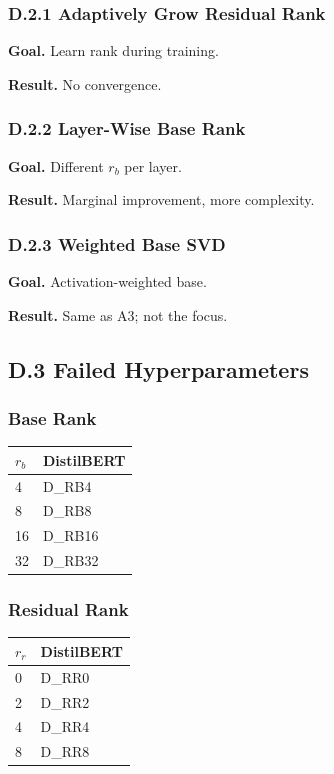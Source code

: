 \subsubsection{D.2.1 Adaptively Grow Residual Rank}

\textbf{Goal.} Learn rank during training.

\textbf{Result.} No convergence.

\subsubsection{D.2.2 Layer-Wise Base Rank}

\textbf{Goal.} Different $r_b$ per layer.

\textbf{Result.} Marginal improvement, more complexity.

\subsubsection{D.2.3 Weighted Base SVD}

\textbf{Goal.} Activation-weighted base.

\textbf{Result.} Same as A3; not the focus.

\subsection{D.3 Failed Hyperparameters}

\subsubsection{Base Rank}

\begin{table}[H]
\centering
\small
\begin{tabular}{ll}
\toprule
\textbf{$r_b$} & \textbf{DistilBERT} \\
\midrule
4 & {{D\_RB4}} \\
8 & {{D\_RB8}} \\
16 & {{D\_RB16}} \\
32 & {{D\_RB32}} \\
\bottomrule
\end{tabular}
\end{table}

\subsubsection{Residual Rank}

\begin{table}[H]
\centering
\small
\begin{tabular}{ll}
\toprule
\textbf{$r_r$} & \textbf{DistilBERT} \\
\midrule
0 & {{D\_RR0}} \\
2 & {{D\_RR2}} \\
4 & {{D\_RR4}} \\
8 & {{D\_RR8}} \\
\bottomrule
\end{tabular}
\end{table}


